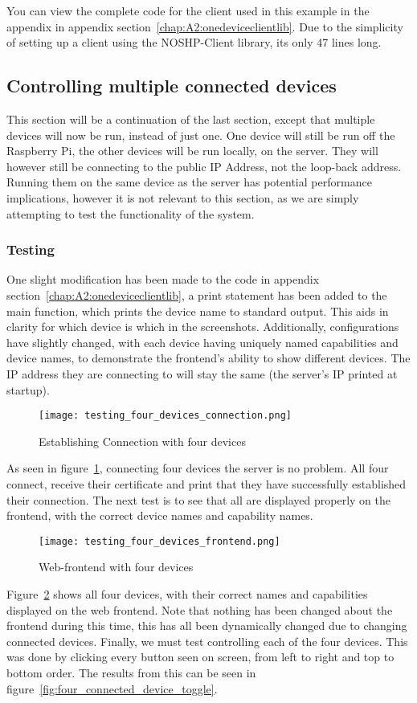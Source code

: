 You can view the complete code for the client used in this example in the appendix in appendix section~\ref{chap:A2:onedeviceclientlib}. Due to the simplicity of setting up a client using the NOSHP-Client library, its only 47 lines long.

\subsection{Controlling multiple connected devices}
This section will be a continuation of the last section, except that multiple devices will now be run, instead of just one. One device will still be run off the Raspberry Pi, the other devices will be run locally, on the server. They will however still be connecting to the public IP Address, not the loop-back address. Running them on the same device as the server has potential performance implications, however it is not relevant to this section, as we are simply attempting to test the functionality of the system.

\subsubsection{Testing}
One slight modification has been made to the code in appendix section~\ref{chap:A2:onedeviceclientlib}, a print statement has been added to the main function, which prints the device name to standard output. This aids in clarity for which device is which in the screenshots. Additionally, configurations have slightly changed, with each device having uniquely named capabilities and device names, to demonstrate the frontend's ability to show different devices. The IP address they are connecting to will stay the same (the server's IP printed at startup).

\begin{figure}[h]
\caption{Establishing Connection with four devices}
\texttt{[image: testing\_four\_devices\_connection.png]}
\label{fig:four_connected_device_connection}
\end{figure}
As seen in figure~\ref{fig:four_connected_device_connection}, connecting four devices the server is no problem. All four connect, receive their certificate and print that they have successfully established their connection. The next test is to see that all are displayed properly on the frontend, with the correct device names and capability names.


\begin{figure}[h]
\caption{Web-frontend with four devices}
\texttt{[image: testing\_four\_devices\_frontend.png]}
\label{fig:four_connected_device_frontend}
\end{figure}
Figure~\ref{fig:four_connected_device_frontend} shows all four devices, with their correct names and capabilities displayed on the web frontend. Note that nothing has been changed about the frontend during this time, this has all been dynamically changed due to changing connected devices. Finally, we must test controlling each of the four devices. This was done by clicking every button seen on screen, from left to right and top to bottom order. The results from this can be seen in figure~\ref{fig:four_connected_device_toggle}.

